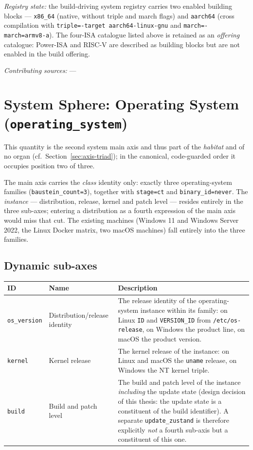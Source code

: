 \emph{Registry state:} the build-driving system registry carries two enabled building blocks --- \texttt{x86\_\allowbreak{}64} (native, without triple and march flags) and \texttt{aarch64} (cross compilation with \texttt{triple=\allowbreak{}-target aarch64-linux-gnu} and \texttt{march=\allowbreak{}-march=armv8-a}). The four-ISA catalogue listed above is retained as an \emph{offering} catalogue: Power-ISA and RISC-V are described as building blocks but are not enabled in the build offering.

\emph{Contributing sources:} ---

\section{System Sphere: Operating System (\texttt{operating\_system})}

This quantity is the second system main axis and thus part of the \emph{habitat} and of no organ (cf.\ Section~\ref{sec:axis-triad}); in the canonical, code-guarded order it occupies position two of three.

The main axis carries the \emph{class} identity only: exactly three operating-system families (\texttt{baustein\_\allowbreak{}count=3}), together with \texttt{stage=ct} and \texttt{binary\_\allowbreak{}id=never}. The \emph{instance} --- distribution, release, kernel and patch level --- resides entirely in the three sub-axes; entering a distribution as a fourth expression of the main axis would miss that cut. The existing machines (Windows 11 and Windows Server 2022, the Linux Docker matrix, two macOS machines) fall entirely into the three families.

\subsection*{Dynamic sub-axes}

\begin{scriptsize}
\begin{longtable}{@{}>{\raggedright\arraybackslash}p{1.8cm} >{\raggedright\arraybackslash}p{3.2cm} >{\raggedright\arraybackslash}p{8.5cm}@{}}
\toprule
ID & Name & Description \\
\midrule
\endhead%
\texttt{os\_\allowbreak{}version} & Distribution/\allowbreak{}release identity & The release identity of the operating-system instance within its family: on Linux \texttt{ID} and \texttt{VERSION\_\allowbreak{}ID} from \texttt{/etc/\allowbreak{}os-release}, on Windows the product line, on macOS the product version. \\
\texttt{kernel} & Kernel release & The kernel release of the instance: on Linux and macOS the \texttt{uname} release, on Windows the NT kernel triple. \\
\texttt{build} & Build and patch level & The build and patch level of the instance \emph{including} the update state (design decision of this thesis: the update state is a constituent of the build identifier). A separate \texttt{update\_\allowbreak{}zustand} is therefore explicitly \emph{not} a fourth sub-axis but a constituent of this one. \\
\bottomrule
\end{longtable}
\end{scriptsize}

